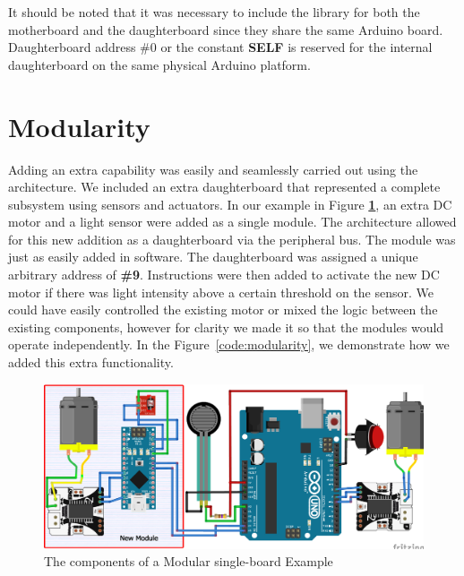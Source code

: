 It should be noted that it was necessary to include the library for both the motherboard and the daughterboard since they share the same Arduino board. Daughterboard address \#0 or the constant \textbf{SELF} is reserved for the internal daughterboard on the same physical Arduino platform.

	\section{Modularity} %
	\label{sec:modularity}
Adding an extra capability was easily and seamlessly carried out using the \xten architecture. We included an extra daughterboard that represented a complete subsystem using sensors and actuators. In our example in Figure \textbf{\ref{fig:modularity}}, an extra DC motor and a light sensor were added as a single module. The \xten architecture allowed for this new addition as a daughterboard via the peripheral bus. The module was just as easily added in software. The daughterboard was assigned a unique arbitrary address of \textbf{\#9}. Instructions were then added to activate the new DC motor if there was light intensity above a certain threshold on the sensor. We could have easily controlled the existing motor or mixed the logic between the existing components, however for clarity we made it so that the modules would operate independently.  In the Figure~\ref{code:modularity}, we demonstrate how we added this extra functionality.

\begin{figure}[h!]
  \begin{center}
    \includegraphics[width=1.0\columnwidth]{Figures/modular-example.pdf}
    \caption{The components of a Modular single-board \xten Example}\label{fig:modularity}
  \end{center}
\end{figure}

